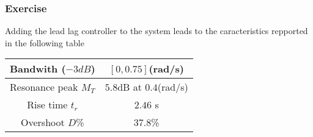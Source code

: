 \subsubsection{Exercise}
\label{exo412}

Adding the lead lag controller to the system leads to the caracteristics repported in the following table

\begin{center}
\begin{tabular}{|c|c|}
    \hline
    Bandwith ($-3dB$) & $[0,0.75]$(rad/s)\\
    \hline
    Resonance peak $M_T$ & $5.8$dB at $0.4$(rad/s)\\
    \hline
    Rise time $t_r$ & $2.46$ s\\
    \hline
    Overshoot $D$\% & $37.8$\%\\
    \hline
\end{tabular}
\end{center}

